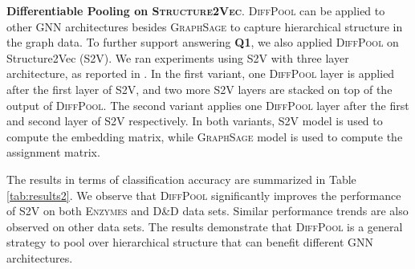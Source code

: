 \documentclass{article}
\newcommand{\xhdr}[1]{{\noindent\bfseries #1}.}
\newcommand{\name}{\textsc{DiffPool}\xspace}
\newcommand{\cut}[1]{}
\begin{document}
\cut{
Graphs in the \textsc{Collab} data set, in contrast, are very dense and do not have a hierarchical structure. As illustrated in Section \ref{sec:sparse_dense}, \name tends to assign nodes in densely connected subgraphs into a single cluster. In practice, we observe that hierarchies deeper than two do not result in performance improvement in this data set, which again stresses that it does not contain any hierarchical structure.}


\xhdr{Differentiable Pooling on \textsc{Structure2Vec}}\label{sec:s2v}
\name can be applied to other GNN architectures besides \textsc{GraphSage} to capture hierarchical structure in the graph data.
To further support answering {\bf Q1}, we also applied \name on Structure2Vec (\textsc{S2V}). 
We ran experiments using \textsc{S2V} with three layer architecture, as reported in \cite{dai2016discriminative}.
In the first variant, one \name layer is applied after the first layer of \textsc{S2V}, and two more \textsc{S2V} layers are stacked on top of the output of \name. The second variant applies one \name layer after the first and second layer of \textsc{S2V} respectively. 
In both variants, \textsc{S2V} model is used to compute the embedding matrix, while \textsc{GraphSage} model is used to compute the assignment matrix.


\begin{table}[htbp]\centering		
\caption{Accuracy results of applying \name to \textsc{S2V}.}
\label{tab:results2}
\end{table}

The results in terms of classification accuracy are summarized in Table \ref{tab:results2}.
We observe that \name significantly improves the performance of S2V on both \textsc{Enzymes} and \textsc{D\&D} data sets. Similar performance trends are also observed on other data sets.
The results demonstrate that \name is a general strategy to pool over hierarchical structure that can benefit different GNN architectures.
\end{document}

